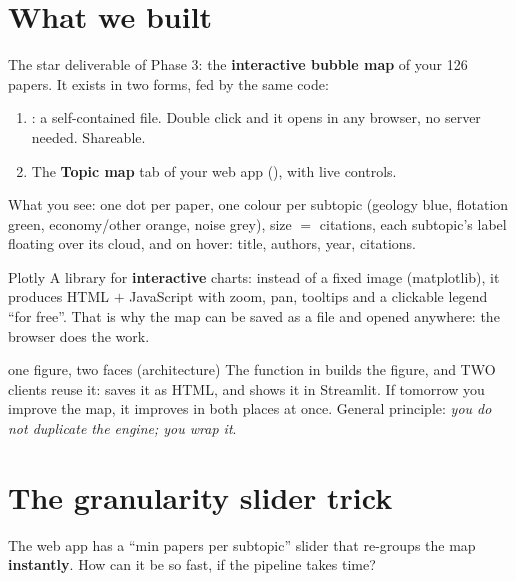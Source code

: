 \documentclass[11pt,a4paper]{article}
\begin{document}

\section{What we built}

The star deliverable of Phase 3: the \textbf{interactive bubble map} of your 126 papers. It
exists in two forms, fed by the same code:
\begin{enumerate}
  \item {}: a self-contained file. Double click and it
        opens in any browser, no server needed. Shareable.
  \item The \textbf{Topic map} tab of your web app (), with live controls.
\end{enumerate}

What you see: one dot per paper, one colour per subtopic (geology blue, flotation green,
economy/other orange, noise grey), size $=$ citations, each subtopic's label floating over its
cloud, and on hover: title, authors, year, citations.

\begin{concepto}{Plotly}
A library for \textbf{interactive} charts: instead of a fixed image (matplotlib), it produces
HTML $+$ JavaScript with zoom, pan, tooltips and a clickable legend ``for free''. That is why
the map can be saved as a file and opened anywhere: the browser does the work.
\end{concepto}

\begin{concepto}{one figure, two faces (architecture)}
The  function in  builds the figure, and
TWO clients reuse it:  saves it as HTML, and  shows it
in Streamlit. If tomorrow you improve the map, it improves in both places at once. General
principle: \emph{you do not duplicate the engine; you wrap it}.
\end{concepto}

\section{The granularity slider trick}

The web app has a ``min papers per subtopic'' slider that re-groups the map \textbf{instantly}.
How can it be so fast, if the pipeline takes time?
\end{document}
